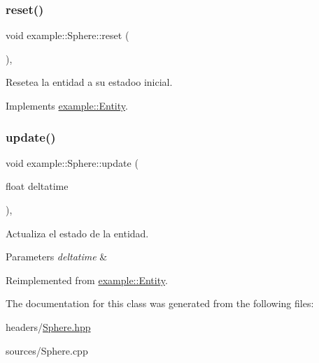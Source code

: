 \subsubsection{\texorpdfstring{reset()}{reset()}}
{\footnotesize\ttfamily void example\+::\+Sphere\+::reset (\begin{DoxyParamCaption}{ }\end{DoxyParamCaption})\hspace{0.3cm}{\ttfamily [override]}, {\ttfamily [virtual]}}



Resetea la entidad a su estadoo inicial. 



Implements \mbox{\hyperlink{classexample_1_1_entity_a38eec21167e85013a5e89a9131458bfa}{example\+::\+Entity}}.

\mbox{\label{classexample_1_1_sphere_a68d6efb4ed4119ddd93570ca689b3d23}} 
\subsubsection{\texorpdfstring{update()}{update()}}
{\footnotesize\ttfamily void example\+::\+Sphere\+::update (\begin{DoxyParamCaption}\item[{float}]{deltatime }\end{DoxyParamCaption})\hspace{0.3cm}{\ttfamily [override]}, {\ttfamily [virtual]}}



Actualiza el estado de la entidad. 


\begin{DoxyParams}{Parameters}
{\em deltatime} & \\
\hline
\end{DoxyParams}


Reimplemented from \mbox{\hyperlink{classexample_1_1_entity_a1f987399c6c2f5e83b2d245d81cc3b7e}{example\+::\+Entity}}.



The documentation for this class was generated from the following files\+:\begin{DoxyCompactItemize}
\item 
headers/\mbox{\hyperlink{_sphere_8hpp}{Sphere.\+hpp}}\item 
sources/Sphere.\+cpp\end{DoxyCompactItemize}
